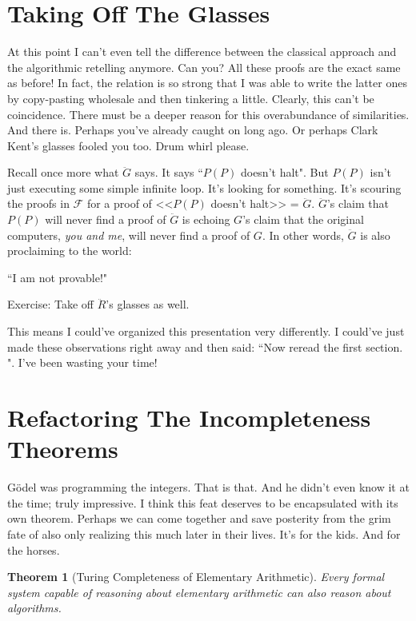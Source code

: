 \documentclass{article}
\theoremstyle{theorem}
\newtheorem{theorem}{Theorem}
\begin{document}
\section{Taking Off The Glasses}

At this point I can't even tell the difference between the classical approach and the algorithmic retelling anymore. Can you? All these proofs are the exact same as before! In fact, the relation is so strong that I was able to write the latter ones by copy-pasting wholesale and then tinkering a little. Clearly, this can't be coincidence. There must be a deeper reason for this overabundance of similarities. And there is. Perhaps you've already caught on long ago. Or perhaps Clark Kent's glasses fooled you too. Drum whirl please.

Recall once more what $\ddot{G}$ says. It says ``$P(P)$ doesn't halt". But $P(P)$ isn't just executing some simple infinite loop. It's looking for something. It's scouring the proofs in $\mathcal{F}$ for a proof of <<$P(P)$ doesn't halt>> = $\ddot{G}$. $\ddot{G}$'s claim that $P(P)$ will never find a proof of $\ddot{G}$ is echoing $G$'s claim that the original computers, \textit{you and me}, will never find a proof of $G$. In other words, $\ddot{G}$ is also proclaiming to the world:
\begin{center}
``I am not provable!"
\end{center}
Exercise: Take off $\ddot{R}$'s glasses as well.

This means I could've organized this presentation very differently. I could've just made these observations right away and then said: ``Now reread the first section. \scalebox{0.9}{$\square$}". I've been wasting your time!

\section{Refactoring The Incompleteness Theorems}

Gödel was programming the integers. That is that. And he didn't even know it at the time; truly impressive. I think this feat deserves to be encapsulated with its own theorem. Perhaps we can come together and save posterity from the grim fate of also only realizing this much later in their lives. It's for the kids. And for the horses.

\begin{theorem}[Turing Completeness of Elementary Arithmetic]
Every formal system capable of reasoning about elementary arithmetic can also reason about algorithms.
\end{theorem}
\end{document}
